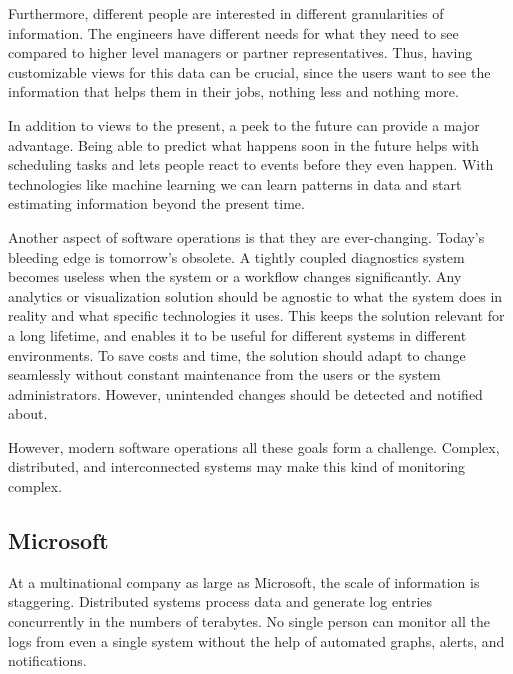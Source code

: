 \documentclass[english,12pt,a4paper,pdftex,sci,utf8]{aaltothesis}
\begin{document}
Furthermore, different people are interested in different granularities of information.
The engineers have different needs for what they need to see compared to higher level managers
or partner representatives.
Thus, having customizable views for this data can be crucial,
since the users want to see the information that helps them in their jobs, nothing less and nothing more.

In addition to views to the present, a peek to the future can provide a major advantage.
Being able to predict what happens soon in the future helps with scheduling tasks and lets people react 
to events before they even happen. With technologies like machine learning we can learn patterns in data and 
start estimating information beyond the present time.

Another aspect of software operations is that they are ever-changing. 
Today's bleeding edge is tomorrow's obsolete. A tightly coupled diagnostics system
becomes useless when the system or a workflow changes significantly. Any analytics or visualization solution should
be agnostic to what the system does in reality and what specific technologies it uses. 
This keeps the solution relevant for a long lifetime, 
and enables it to be useful for different systems in different environments. 
To save costs and time, the solution should adapt to change seamlessly without constant maintenance from the users or the system administrators. However, unintended changes should be detected and notified about.

However, modern software operations all these goals form a challenge.
Complex, distributed, and interconnected systems may make this kind of monitoring complex.

\subsection{Microsoft}
At a multinational company as large as Microsoft, the scale of information is staggering.
Distributed systems process data and generate log entries concurrently in the numbers of terabytes.
No single person can monitor all the logs from even a single system without the help of automated
graphs, alerts, and notifications.  
\end{document}
